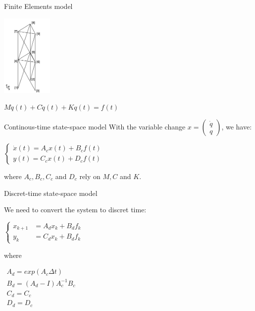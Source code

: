 \documentclass{beamer}
\begin{document}
\begin{frame}{Finite Elements model}

\begin{center}
\includegraphics[height=4cm]{images/finite_element.png}

$M \ddot{q}(t) + C \dot{q}(t) + K q(t) = f(t)$
\end{center}

\end{frame}


\begin{frame}{Continous-time state-space model}
With the variable change $x =
\begin{pmatrix}
\dot{q} \\
q
\end{pmatrix}$, we have:


\begin{center}
$\left\{
\begin{array}{ll}
\dot{x}(t) = A_cx(t) + B_cf(t) \\
y(t) = C_cx(t) + D_cf(t)
\end{array}
\right.$
\end{center}

where $A_c, B_c, C_c$ and $D_c$ rely on $M, C$ and $K$.

\end{frame}


\begin{frame}{Discret-time state-space model}

We need to convert the system to discret time:

\begin{center}

$\left\{
\begin{array}{ll}
x_{k+1} & = A_dx_k + B_df_k \\
y_k & = C_dx_k + B_df_k
\end{array}
\right.$


\end{center}

where

\begin{center}


$\begin{array}{ll}
A_d = exp(A_c \Delta t) \\
B_d= (A_d - I) A^{-1}_c B_c \\
C_d = C_c \\
D_d = D_c
\end{array}$

\end{center}


\end{frame}
\end{document}
